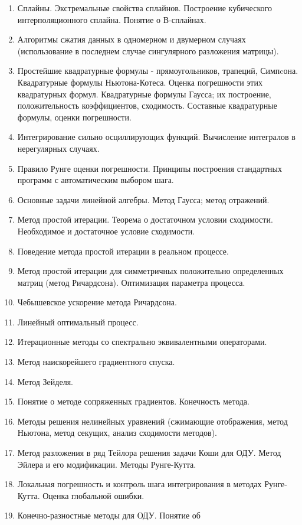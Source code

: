 \documentclass[a4paper]{article}
\begin{document}
\begin{enumerate}
\item Сплайны. Экстремальные свойства сплайнов. Построение кубического
  интерполяционного сплайна. Понятие о В-сплайнах.
\item Алгоритмы сжатия данных в одномерном и двумерном случаях
  (использование в последнем случае сингулярного разложения матрицы).
\item Простейшие квадратурные формулы - прямоугольников, трапеций,
  Симпcона. Квадратурные формулы Ньютона-Котеса. Оценка погрешности
  этих квадратурных формул. Квадратурные формулы Гаусса; их
  построение, положительность коэффициентов, сходимость. Составные
  квадратурные формулы, оценки погрешности.
\item Интегрирование сильно осциллирующих функций. Вычисление
  интегралов в нерегулярных случаях.
\item Правило Рунге оценки погрешности. Принципы построения
  стандартных программ с автоматическим выбором шага.
\item Основные задачи линейной алгебры. Метод Гаусса; метод отражений.
\item Метод простой итерации. Теорема о достаточном условии
  сходимости. Необходимое и достаточное условие сходимости.
\item Поведение метода простой итерации в реальном процессе.
\item Метод простой итерации для симметричных положительно
  определенных матриц (метод Ричардсона). Оптимизация параметра
  процесса.
\item Чебышевское ускорение метода Ричардсона.
\item Линейный оптимальный процесс.
\item Итерационные методы со спектрально эквивалентными операторами.
\item Метод наискорейшего градиентного спуска.
\item Метод Зейделя.
\item Понятие о методе сопряженных градиентов. Конечность метода.
\item Методы решения нелинейных уравнений (сжимающие отображения,
  метод Ньютона, метод секущих, анализ сходимости методов).
\item Метод разложения в ряд Тейлора решения задачи Коши для
  ОДУ. Метод Эйлера и его модификации. Методы Рунге-Кутта.
\item Локальная погрешность и контроль шага интегрирования в методах
  Рунге-Кутта.  Оценка глобальной ошибки.
\item Конечно-разностные методы для ОДУ. Понятие об

\end{enumerate}
\end{document}
